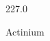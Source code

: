 \documentclass[12pt]{article}
\begin{document}
\hfill{}
\vfill
\begin{center}
  {\fontsize{50}{60}
  }

  227.0

Actinium
\end{center}
\vfill
\end{document}
